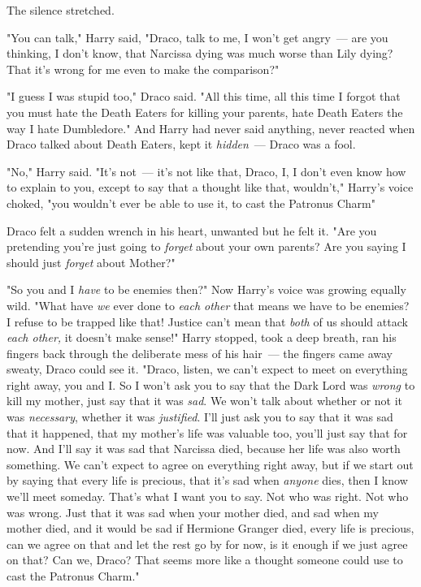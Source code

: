 The silence stretched.

"You can talk," Harry said, "Draco, talk to me, I won't get angry~--- are you
thinking, I don't know, that Narcissa dying was much worse than Lily dying?
That it's wrong for me even to make the comparison?"

"I guess I was stupid too," Draco said. "All this time, all this time I forgot
that you must hate the Death Eaters for killing your parents, hate Death Eaters
the way I hate Dumbledore." And Harry had never said anything, never reacted
when Draco talked about Death Eaters, kept it \emph{hidden}~--- Draco was a fool.

"No," Harry said. "It's not~--- it's not like that, Draco, I, I don't even know
how to explain to you, except to say that a thought like that, wouldn't,"
Harry's voice choked, "you wouldn't ever be able to use it, to cast the
Patronus Charm{\el}"

Draco felt a sudden wrench in his heart, unwanted but he felt it. "Are you
pretending you're just going to \emph{forget} about your own parents? Are you
saying I should just \emph{forget} about Mother?"

"So you and I \emph{have} to be enemies then?" Now Harry's voice was growing
equally wild. "What have \emph{we} ever done to \emph{each other} that means we
have to be enemies? I refuse to be trapped like that! Justice can't mean that
\emph{both} of us should attack \emph{each other,} it doesn't make sense!"
Harry stopped, took a deep breath, ran his fingers back through the deliberate
mess of his hair~--- the fingers came away sweaty, Draco could see it. "Draco,
listen, we can't expect to meet on everything right away, you and I. So I won't
ask you to say that the Dark Lord was \emph{wrong} to kill my mother, just say
that it was{\el} \emph{sad}. We won't talk about whether or not it was
\emph{necessary}, whether it was \emph{justified}. I'll just ask you to say
that it was sad that it happened, that my mother's life was valuable too,
you'll just say that for now. And I'll say it was sad that Narcissa died,
because her life was also worth something. We can't expect to agree on
everything right away, but if we start out by saying that every life is
precious, that it's sad when \emph{anyone} dies, then I know we'll meet
someday. That's what I want you to say. Not who was right. Not who was wrong.
Just that it was sad when your mother died, and sad when my mother died, and it
would be sad if Hermione Granger died, every life is precious, can we agree on
that and let the rest go by for now, is it enough if we just agree on that? Can
we, Draco? That seems{\el} more like a thought someone could use to cast the
Patronus Charm."

